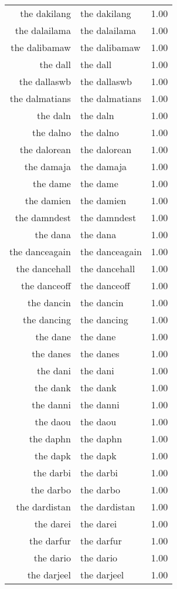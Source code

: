 \begin{table}[ht]
\begin{tabular}{rlr}
  the dakilang & the dakilang & 1.00 \\ 
  the dalailama & the dalailama & 1.00 \\ 
  the dalibamaw & the dalibamaw & 1.00 \\ 
  the dall & the dall & 1.00 \\ 
  the dallaswb & the dallaswb & 1.00 \\ 
  the dalmatians & the dalmatians & 1.00 \\ 
  the daln & the daln & 1.00 \\ 
  the dalno & the dalno & 1.00 \\ 
  the dalorean & the dalorean & 1.00 \\ 
  the damaja & the damaja & 1.00 \\ 
  the dame & the dame & 1.00 \\ 
  the damien & the damien & 1.00 \\ 
  the damndest & the damndest & 1.00 \\ 
  the dana & the dana & 1.00 \\ 
  the danceagain & the danceagain & 1.00 \\ 
  the dancehall & the dancehall & 1.00 \\ 
  the danceoff & the danceoff & 1.00 \\ 
  the dancin & the dancin & 1.00 \\ 
  the dancing & the dancing & 1.00 \\ 
  the dane & the dane & 1.00 \\ 
  the danes & the danes & 1.00 \\ 
  the dani & the dani & 1.00 \\ 
  the dank & the dank & 1.00 \\ 
  the danni & the danni & 1.00 \\ 
  the daou & the daou & 1.00 \\ 
  the daphn & the daphn & 1.00 \\ 
  the dapk & the dapk & 1.00 \\ 
  the darbi & the darbi & 1.00 \\ 
  the darbo & the darbo & 1.00 \\ 
  the dardistan & the dardistan & 1.00 \\ 
  the darei & the darei & 1.00 \\ 
  the darfur & the darfur & 1.00 \\ 
  the dario & the dario & 1.00 \\ 
  the darjeel & the darjeel & 1.00 \\ 

\end{tabular}
\end{table}
